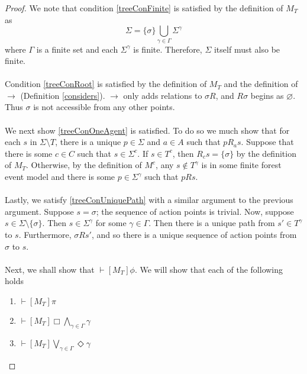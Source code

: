 \documentclass[12pt, a4paper, titlepage]{scrartcl}
\numberwithin{equation}{section}
\newcommand{\sqex}[1]{[{#1}]}
\begin{document}
\begin{proof}
We note that condition \ref{treeConFinite} is satisfied by the definition of $M_T$ as
\[\Sigma = \{\sigma\} \bigcup_{\gamma \in \Gamma} \Sigma^{\gamma}\]
where $\Gamma$ is a finite set and each $\Sigma^\gamma$ is finite.
Therefore, $\Sigma$ itself must also be finite.\\
\\
Condition \ref{treeConRoot} is satisfied by the definition of $M_T$ and the definition of $\to$
(Definition \ref{considers}).
$\to$ only adds relations to $\sigma R$, and $R \sigma$ begins as $\varnothing$.
Thus $\sigma$ is not accessible from any other points.\\
\\
We next show \ref{treeConOneAgent} is satisfied.
To do so we much show that for each $s$ in $\Sigma \setminus T$, there is a unique
$p \in \Sigma$ and $a \in A$ such that $p R_a s$.
Suppose that there is some $c \in C$ such that $s \in \Sigma^c$.
If $s \in T^c$, then $R_c s = \{ \sigma \}$ by the definition of $M_T$.
Otherwise, by the definition of $M^c$, any $s \notin T^\gamma$ is in some finite
forest event model and there is some $p \in \Sigma^\gamma$ such that $p R s$.\\
\\
Lastly, we satisfy \ref{treeConUniquePath} with a similar argument to the previous argument.
Suppose $s = \sigma$; the sequence of action points is trivial.
Now, suppose $s \in \Sigma \setminus \{ \sigma \}$.
Then $s \in \Sigma^\gamma$ for some $\gamma \in \Gamma$.
Then there is a unique path from $s' \in T^\gamma$ to $s$.
Furthermore, $\sigma R s'$, and so there is a unique sequence of action points from $\sigma$ to $s$.\\
\\
Next, we shall show that $\vdash \sqex{M_T} \phi$.
We will show that each of the following holds
\begin{enumerate}
	\item $\vdash \sqex{M_T} \pi$
	\item $\vdash \sqex{M_T} \Box \bigwedge_{\gamma \in \Gamma} \gamma$
	\item $\vdash \sqex{M_T} \bigvee_{\gamma \in \Gamma} \Diamond \gamma$
\end{enumerate}


\end{proof}
\end{document}
